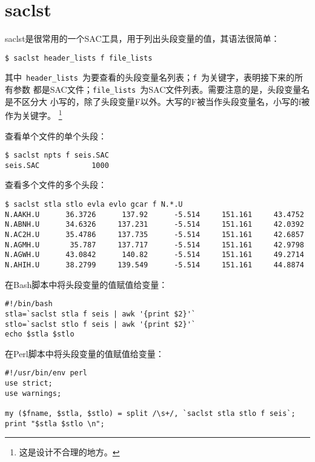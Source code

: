 \section{saclst}
\label{sec:saclst}

saclst是很常用的一个SAC工具，用于列出头段变量的值，其语法很简单：
\begin{verbatim}
$ saclst header_lists f file_lists
\end{verbatim}
其中~\verb+header_lists+~为要查看的头段变量名列表；\verb+f+~为关键字，表明接下来的所有参数
都是SAC文件；\verb+file_lists+~为SAC文件列表。需要注意的是，头段变量名是不区分大
小写的，除了头段变量F以外。大写的F被当作头段变量名，小写的f被作为关键字。
\footnote{这是设计不合理的地方。}

查看单个文件的单个头段：
\begin{verbatim}
$ saclst npts f seis.SAC
seis.SAC            1000
\end{verbatim}

查看多个文件的多个头段：
\begin{verbatim}
$ saclst stla stlo evla evlo gcar f N.*.U
N.AAKH.U      36.3726      137.92      -5.514     151.161     43.4752
N.ABNH.U      34.6326     137.231      -5.514     151.161     42.0392
N.AC2H.U      35.4786     137.735      -5.514     151.161     42.6857
N.AGMH.U       35.787     137.717      -5.514     151.161     42.9798
N.AGWH.U      43.0842      140.82      -5.514     151.161     49.2714
N.AHIH.U      38.2799     139.549      -5.514     151.161     44.8874
\end{verbatim}

在Bash脚本中将头段变量的值赋值给变量：
\begin{verbatim}
#!/bin/bash
stla=`saclst stla f seis | awk '{print $2}'`
stlo=`saclst stlo f seis | awk '{print $2}'`
echo $stla $stlo
\end{verbatim}

在Perl脚本中将头段变量的值赋值给变量：
\begin{verbatim}
#!/usr/bin/env perl 
use strict;
use warnings;

my ($fname, $stla, $stlo) = split /\s+/, `saclst stla stlo f seis`;
print "$stla $stlo \n";
\end{verbatim}
